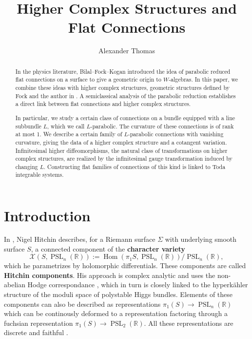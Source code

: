 \documentclass[11pt]{amsart}
\numberwithin{thm}{section} %
\numberwithin{equation}{section} %
\numberwithin{figure}{section} %
\newcommand*{\R}{\mathbb{R}}
\DeclareMathOperator{\Hom}{Hom}
\DeclareMathOperator{\PSL}{PSL}
\begin{document}
\author{Alexander Thomas}
\title{Higher Complex Structures and Flat Connections}
\address{Université Claude Bernard Lyon 1, Institut Camille Jordan, 21 bv Claude Bernard, 69100 Villeurbanne}


\begin{abstract}
In the physics literature, Bilal--Fock--Kogan \cite{BFK} introduced the idea of parabolic reduced flat connections on a surface to give a geometric origin to $W$-algebras. In this paper, we combine these ideas with higher complex structures, geometric structures defined by Fock and the author in \cite{FockThomas}. A semiclassical analysis of the parabolic reduction establishes a direct link between flat connections and higher complex structures.

In particular, we study a certain class of connections on a bundle equipped with a line subbundle $L$, which we call $L$-parabolic. The curvature of these connections is of rank at most 1. We describe a certain family of $L$-parabolic connections with vanishing curvature, giving the data of a higher complex structure and a cotangent variation. 
Infinitesimal higher diffeomorphisms, the natural class of transformations on higher complex structures, are realized by the infinitesimal gauge transformation induced by changing $L$. Constructing flat families of connections of this kind is linked to Toda integrable systems.
\end{abstract}

\maketitle

\setcounter{tocdepth}{1}
\tableofcontents


\section{Introduction}

In \cite{Hit.1}, Nigel Hitchin describes, for a Riemann surface $\Sigma$ with underlying smooth surface $S$, a connected component of the \textbf{character variety}
$$\mathcal{X}(S, \PSL_n(\R)) := \Hom(\pi_1 S, \PSL_n(\R))/\PSL_n(\R),$$
which he parametrizes by holomorphic differentials. These components are called \textbf{Hitchin components}. 
His approach is complex analytic and uses the non-abelian Hodge correspondance \cite{Corlette, Donaldson, Simpson, Hit.2}, which in turn is closely linked to the hyperkähler structure of the moduli space of polystable Higgs bundles. Elements of these components can also be described as representations $\pi_1(S)\to \PSL_n(\R)$ which can be continously deformed to a representation factoring through a fuchsian representation $\pi_1(S)\to\PSL_2(\R)$. All these representations are discrete and faithful \cite{Lab,FG}.
\end{document}
